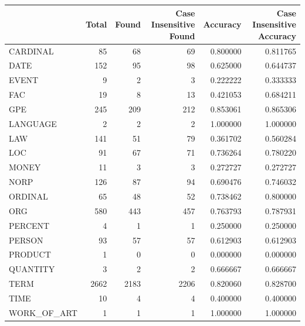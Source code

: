 \begin{tabular}{lrrrrr}
\toprule
 & Total & Found & Case Insensitive Found & Accuracy & Case Insensitive Accuracy \\
\midrule
CARDINAL & 85 & 68 & 69 & 0.800000 & 0.811765 \\
DATE & 152 & 95 & 98 & 0.625000 & 0.644737 \\
EVENT & 9 & 2 & 3 & 0.222222 & 0.333333 \\
FAC & 19 & 8 & 13 & 0.421053 & 0.684211 \\
GPE & 245 & 209 & 212 & 0.853061 & 0.865306 \\
LANGUAGE & 2 & 2 & 2 & 1.000000 & 1.000000 \\
LAW & 141 & 51 & 79 & 0.361702 & 0.560284 \\
LOC & 91 & 67 & 71 & 0.736264 & 0.780220 \\
MONEY & 11 & 3 & 3 & 0.272727 & 0.272727 \\
NORP & 126 & 87 & 94 & 0.690476 & 0.746032 \\
ORDINAL & 65 & 48 & 52 & 0.738462 & 0.800000 \\
ORG & 580 & 443 & 457 & 0.763793 & 0.787931 \\
PERCENT & 4 & 1 & 1 & 0.250000 & 0.250000 \\
PERSON & 93 & 57 & 57 & 0.612903 & 0.612903 \\
PRODUCT & 1 & 0 & 0 & 0.000000 & 0.000000 \\
QUANTITY & 3 & 2 & 2 & 0.666667 & 0.666667 \\
TERM & 2662 & 2183 & 2206 & 0.820060 & 0.828700 \\
TIME & 10 & 4 & 4 & 0.400000 & 0.400000 \\
WORK_OF_ART & 1 & 1 & 1 & 1.000000 & 1.000000 \\
\bottomrule
\end{tabular}
